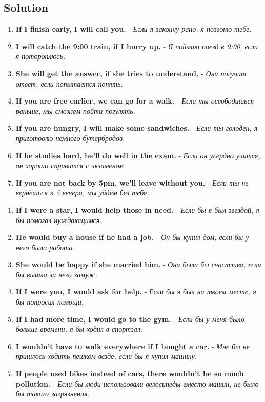 \subsection*{Solution}
\begin{enumerate}
      \item \textbf{If I finish early, I will call you.} - \textit{Если я закончу рано, я позвоню тебе.}
      \item \textbf{I will catch the 9:00 train, if I hurry up.} - \textit{Я поймаю поезд в 9:00, если я потороплюсь.}
      \item \textbf{She will get the answer, if she tries to understand.} - \textit{Она получит ответ, если попытается понять.}
      \item \textbf{If you are free earlier, we can go for a walk.} - \textit{Если ты освободишься раньше, мы сможем пойти погулять.}
      \item \textbf{If you are hungry, I will make some sandwiches.} - \textit{Если ты голоден, я приготовлю немного бутербродов.}
      \item \textbf{If he studies hard, he’ll do well in the exam.} - \textit{Если он усердно учится, он хорошо справится с экзаменом.}
      \item \textbf{If you are not back by 5pm, we’ll leave without you.} - \textit{Если ты не вернёшься к 5 вечера, мы уйдем без тебя.}
\end{enumerate}

\begin{enumerate}
      \item \textbf{If I were a star, I would help those in need.} - \textit{Если бы я был звездой, я бы помогал нуждающимся.}
      \item \textbf{He would buy a house if he had a job.} - \textit{Он бы купил дом, если бы у него была работа.}
      \item \textbf{She would be happy if she married him.} - \textit{Она была бы счастлива, если бы вышла за него замуж.}
      \item \textbf{If I were you, I would ask for help.} - \textit{Если бы я был на твоем месте, я бы попросил помощи.}
      \item \textbf{If I had more time, I would go to the gym.} - \textit{Если бы у меня было больше времени, я бы ходил в спортзал.}
      \item \textbf{I wouldn’t have to walk everywhere if I bought a car.} - \textit{Мне бы не пришлось ходить пешком везде, если бы я купил машину.}
      \item \textbf{If people used bikes instead of cars, there wouldn’t be so much pollution.} - \textit{Если бы люди использовали велосипеды вместо машин, не было бы такого загрязнения.}
\end{enumerate}

